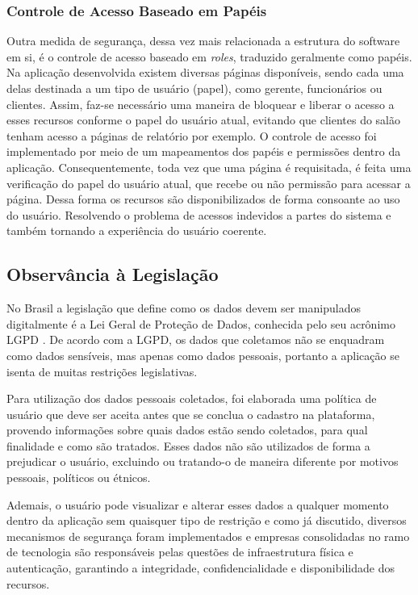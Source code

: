 \subsubsection{Controle de Acesso Baseado em Papéis}
Outra medida de segurança, dessa vez mais relacionada a estrutura do software em si, é o controle de acesso baseado em \textit{roles}, traduzido geralmente como papéis.
Na aplicação desenvolvida existem diversas páginas disponíveis, sendo cada uma delas destinada a um tipo de usuário (papel), como gerente, funcionários ou clientes. Assim, faz-se necessário uma maneira de bloquear e liberar o acesso a esses recursos conforme o papel do usuário atual, evitando que clientes do salão tenham acesso a páginas de relatório por exemplo.
O controle de acesso foi implementado por meio de um mapeamentos dos papéis e permissões dentro da aplicação. Consequentemente, toda vez que uma página é requisitada, é feita uma verificação do papel do usuário atual, que recebe ou não permissão para acessar a página.
Dessa forma os recursos são disponibilizados de forma consoante ao uso do usuário. Resolvendo o problema de acessos indevidos a partes do sistema e também tornando a experiência do usuário coerente.

\subsection{Observância à Legislação}
No Brasil a legislação que define como os dados devem ser manipulados digitalmente é a Lei Geral de Proteção de Dados, conhecida pelo seu acrônimo LGPD \cite{lgpd}. De acordo com a LGPD, os dados que coletamos não se enquadram como dados sensíveis, mas apenas como dados pessoais, portanto a aplicação se isenta de muitas restrições legislativas.

Para utilização dos dados pessoais coletados, foi elaborada uma política de usuário que deve ser aceita antes que se conclua o cadastro na plataforma, provendo informações sobre quais dados estão sendo coletados, para qual finalidade e como são tratados.  Esses dados não são utilizados de forma a prejudicar o usuário, excluindo ou tratando-o de maneira diferente por motivos pessoais, políticos ou étnicos. 

Ademais, o usuário pode visualizar e alterar esses dados a qualquer momento dentro da aplicação sem quaisquer tipo de restrição e como já discutido, diversos mecanismos de segurança foram implementados e empresas consolidadas no ramo de tecnologia são responsáveis pelas questões de infraestrutura física e autenticação, garantindo a integridade, confidencialidade e disponibilidade dos recursos.
